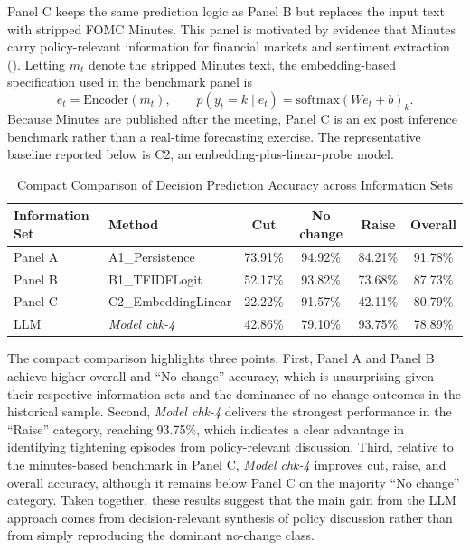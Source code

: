 Panel C keeps the same prediction logic as Panel B but replaces the input text with stripped FOMC Minutes. This panel is motivated by evidence that Minutes carry policy-relevant information for financial markets and sentiment extraction (\cite{jubinski2013fomc,tadle2022fomc}). Letting $m_t$ denote the stripped Minutes text, the embedding-based specification used in the benchmark panel is
\begin{equation}
e_t=\mathrm{Encoder}(m_t),\qquad p(y_t=k\mid e_t)=\mathrm{softmax}(We_t+b)_k.
\end{equation}
Because Minutes are published after the meeting, Panel C is an ex post inference benchmark rather than a real-time forecasting exercise. The representative baseline reported below is C2, an embedding-plus-linear-probe model.

\begin{table}[htbp]
    \centering
    \footnotesize
    \begin{tabular}{llcccc}
        \toprule
        \textbf{Information Set} & \textbf{Method} & \textbf{Cut} & \textbf{No change} & \textbf{Raise} & \textbf{Overall} \\
        \midrule
        Panel A & A1\_Persistence & 73.91\% & 94.92\% & 84.21\% & 91.78\% \\
        Panel B & B1\_TFIDFLogit & 52.17\% & 93.82\% & 73.68\% & 87.73\% \\
        Panel C & C2\_EmbeddingLinear & 22.22\% & 91.57\% & 42.11\% & 80.79\% \\
        LLM & \textit{Model chk-4} & 42.86\% & 79.10\% & 93.75\% & 78.89\% \\
        \bottomrule
    \end{tabular}
    \caption{Compact Comparison of Decision Prediction Accuracy across Information Sets}
    \label{tab:ch2:decision_acc_overview}
\end{table}

The compact comparison highlights three points. First, Panel A and Panel B achieve higher overall and ``No change'' accuracy, which is unsurprising given their respective information sets and the dominance of no-change outcomes in the historical sample. Second, \textit{Model chk-4} delivers the strongest performance in the ``Raise'' category, reaching 93.75\%, which indicates a clear advantage in identifying tightening episodes from policy-relevant discussion. Third, relative to the minutes-based benchmark in Panel C, \textit{Model chk-4} improves cut, raise, and overall accuracy, although it remains below Panel C on the majority ``No change'' category. Taken together, these results suggest that the main gain from the LLM approach comes from decision-relevant synthesis of policy discussion rather than from simply reproducing the dominant no-change class.







